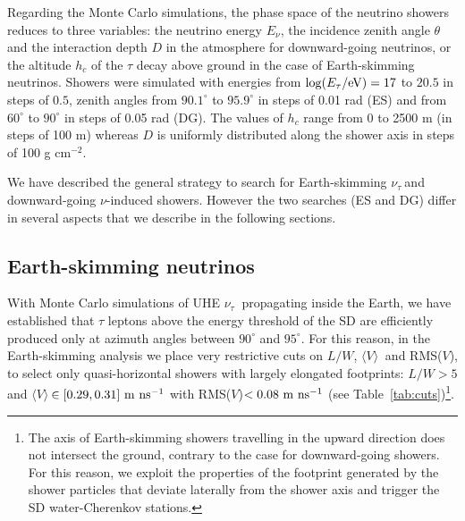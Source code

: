 \documentclass[reprint,showpacs,showkeys,amsmath,amssymb,aps,nofootinbib]{revtex4-1}
\def \nutau {$\nu_\tau~$}
\def \vavrg {$\langle V \rangle ~$}
\begin{document}
Regarding the Monte Carlo simulations, the phase space of the neutrino 
showers reduces to three variables:
the neutrino energy $E_\nu$, the incidence zenith angle $\theta$ 
and the interaction depth $D$ in the atmosphere for downward-going neutrinos,
or the altitude $h_c$ of the $\tau$ decay above ground
in the case of Earth-skimming neutrinos.
Showers were simulated
with energies from $\log(E_{\tau}/{\rm eV}) = 17$ to $20.5$ in steps of $0.5$,
zenith angles from $90.1^{\circ}$ to $95.9^{\circ}$ in steps of 0.01 rad (ES) 
and from $60^{\circ}$ to $90^{\circ}$ in steps of 0.05 rad (DG).
The values of $h_c$ range from 0 to 2500 m (in steps of 100 m)
whereas $D$ is uniformly distributed along the shower axis
in steps of 100 g cm$^{-2}$.

We have described the general strategy to search for Earth-skimming \nutau and 
downward-going $\nu$-induced showers. However the two searches (ES and DG) 
differ in several aspects
that we describe in the following sections.

\subsection{Earth-skimming neutrinos} 

With Monte Carlo simulations of UHE \nutau 
propagating inside the Earth, we have established
that $\tau$ leptons above the energy threshold
of the SD are efficiently produced only at 
azimuth angles between $90^\circ$ and $95^\circ$. 
For this reason, in the Earth-skimming analysis 
we place very restrictive cuts on $L/W$, \vavrg 
and RMS($V$), to select only quasi-horizontal showers 
with largely elongated footprints:
$L/W>5$ and  \vavrg $\in [0.29, 0.31]~{\rm m~ns^{-1}}$
with RMS($V$)$<0.08~{\rm m~ns^{-1}}$ 
(see Table~\ref{tab:cuts})\footnote{
The axis of Earth-skimming showers travelling in
the upward direction does not intersect the ground,
contrary to the case for downward-going showers. 
For this reason, we exploit the properties of the
footprint generated by the shower particles that
deviate laterally from the shower axis and trigger
the SD water-Cherenkov stations.}.
\end{document}
